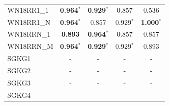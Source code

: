 \begin{table}[t]
{\begin{tabular}{l||cc||cc}
WN18RR1\_1 & \textbf{0.964}$^*$ & \textbf{0.929}$^*$ & 0.857 & 0.536 \\
WN18RR1\_N & \textbf{0.964}$^*$ & 0.857 & 0.929$^*$ & \textbf{1.000}$^*$ \\
WN18RRN\_1 & \textbf{0.893} & \textbf{0.964}$^*$ & 0.857 & 0.857 \\
WN18RRN\_M & \textbf{0.964}$^*$ & \textbf{0.929}$^*$ & 0.929$^*$ & 0.893 \\
\hline
SGKG1 & - & - & - & - \\
SGKG2 & - & - & - & - \\
SGKG3 & - & - & - & - \\
SGKG4 & - & - & - & - \\
\hline
\end{tabular}%
}
\end{table}
